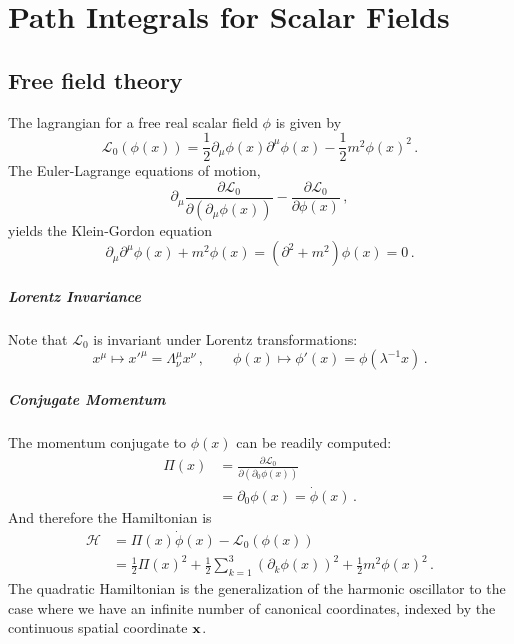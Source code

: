 \documentclass[notes]{subfiles}
\begin{document}
  \chapter{Path Integrals for Scalar Fields}
  \label{cha:path-integr-scal}
  \section{Free field theory}
  \label{sec:real-scalar-field}

  The lagrangian for a free real scalar field $\phi$ is given by
  \begin{equation}
    \label{eq:RealScalLagr}
    \mathcal{L}_0\left(\phi(x)\right)=
    \frac12 \partial_\mu \phi(x) \partial^\mu \phi(x) - 
    \frac12 m^2 \phi(x)^2\, .
  \end{equation}
  The Euler-Lagrange equations of motion, 
  \begin{equation}
    \label{eq:EulerLagrange}
    \partial_\mu \frac{\partial \mathcal{L}_0}{\partial\left(\partial_\mu \phi(x)\right)} 
    - \frac{\partial \mathcal{L}_0}{\partial \phi(x)}\, ,
  \end{equation}
  yields the Klein-Gordon equation
  \begin{equation}
    \label{eq:KleinGordonScal}
    \partial_\mu \partial^\mu \phi(x) + m^2 \phi(x) = \left( \partial^2 + m^2 \right) \phi(x) = 0\, . 
  \end{equation}

  \paragraph{Lorentz Invariance}

  Note that $\mathcal{L}_0$ is invariant under Lorentz transformations:
  \begin{equation}
    \label{eq:LorentzTransfScal}
    x^\mu \mapsto x'^\mu =  \Lambda^\mu_\nu x^\nu\, , \quad \quad 
    \phi(x) \mapsto \phi'(x) = \phi(\lambda^{-1}x)\, .
  \end{equation}

  \paragraph{Conjugate Momentum} 

  The momentum conjugate to $\phi(x)$ can be readily computed:
  \begin{align}
    \label{eq:ScalMom}
    \Pi(x) &= \frac{\partial \mathcal{L}_0}{\partial (\partial_0\phi(x))} \\
    &= \partial_0 \phi(x) = \dot{\phi}(x)\, .
  \end{align}
  And therefore the Hamiltonian is 
  \begin{align}
    \mathcal{H} &= \Pi(x) \dot{\phi}(x) - \mathcal{L}_0\left(\phi(x)\right) \\
    &= \frac12 \Pi(x)^2 + \frac12 \sum_{k=1}^3 \left(\partial_k \phi(x)\right)^2
      + \frac12 m^2 \phi(x)^2\, .
  \end{align}
  The quadratic Hamiltonian is the generalization of the harmonic oscillator to the case where we have an infinite number of canonical coordinates, indexed by the continuous spatial coordinate ${\mathbf x}$. 
\end{document}
